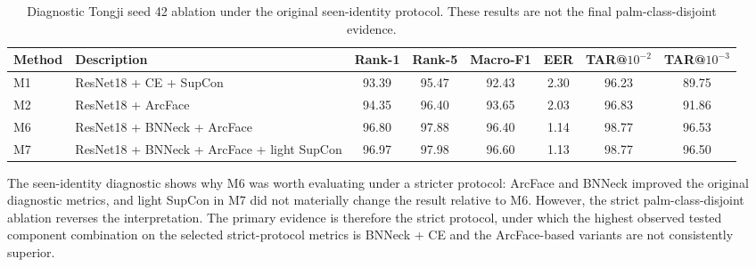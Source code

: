 \begin{table}[t]
\centering
\scriptsize
\setlength{\tabcolsep}{3pt}
\caption{Diagnostic Tongji seed 42 ablation under the original seen-identity protocol. These results are not the final palm-class-disjoint evidence.}
\label{tab:seen_identity_ablation_scope}
\begin{tabular}{llcccccc}
\toprule
Method & Description & Rank-1 & Rank-5 & Macro-F1 & EER & TAR@$10^{-2}$ & TAR@$10^{-3}$ \\
\midrule
M1 & ResNet18 + CE + SupCon & 93.39 & 95.47 & 92.43 & 2.30 & 96.23 & 89.75 \\
M2 & ResNet18 + ArcFace & 94.35 & 96.40 & 93.65 & 2.03 & 96.83 & 91.86 \\
M6 & ResNet18 + BNNeck + ArcFace & 96.80 & 97.88 & 96.40 & 1.14 & 98.77 & 96.53 \\
M7 & ResNet18 + BNNeck + ArcFace + light SupCon & 96.97 & 97.98 & 96.60 & 1.13 & 98.77 & 96.50 \\
\bottomrule
\end{tabular}%
\end{table}

The seen-identity diagnostic shows why M6 was worth evaluating under a stricter protocol: ArcFace and BNNeck improved the original diagnostic metrics, and light SupCon in M7 did not materially change the result relative to M6. However, the strict palm-class-disjoint ablation reverses the interpretation. The primary evidence is therefore the strict protocol, under which the highest observed tested component combination on the selected strict-protocol metrics is BNNeck + CE and the ArcFace-based variants are not consistently superior.


